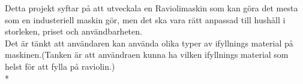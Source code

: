 Detta projekt syftar på att utveckala en Raviolimaskin som kan göra det mesta som en industeriell maskin gör, men det ska vara rätt anpassad till hushåll i storleken, priset och användbarheten. \\

Det är tänkt att användaren kan använda olika typer av ifyllnings material på maskinen.(Tanken är att användraen kunna ha vilken ifyllnings material som helst för att fylla på raviolin.)\\*



